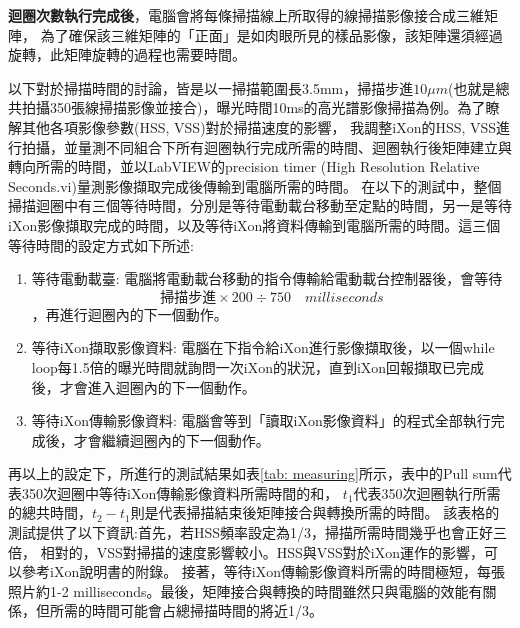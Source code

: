 \documentclass[12pt]{article}
\begin{document}
\textbf{迴圈次數執行完成後}，電腦會將每條掃描線上所取得的線掃描影像接合成三維矩陣，
為了確保該三維矩陣的「正面」是如肉眼所見的樣品影像，該矩陣還須經過旋轉，此矩陣旋轉的過程也需要時間。

以下對於掃描時間的討論，皆是以一掃描範圍長3.5mm，掃描步進$10\mu m$(也就是總共拍攝350張線掃描影像並接合)，曝光時間10ms的高光譜影像掃描為例。為了瞭解其他各項影像參數(HSS, VSS)對於掃描速度的影響，
我調整iXon的HSS, VSS進行拍攝，並量測不同組合下所有迴圈執行完成所需的時間、迴圈執行後矩陣建立與轉向所需的時間，並以LabVIEW的precision timer (High Resolution Relative Seconds.vi)量測影像擷取完成後傳輸到電腦所需的時間。
在以下的測試中，整個掃描迴圈中有三個等待時間，分別是等待電動載台移動至定點的時間，另一是等待iXon影像擷取完成的時間，以及等待iXon將資料傳輸到電腦所需的時間。這三個等待時間的設定方式如下所述:
\begin{enumerate}
    \item 等待電動載臺: 電腦將電動載台移動的指令傳輸給電動載台控制器後，會等待\begin{equation} \label{eq: stageWait}
              \text{掃描步進}\times 200 \div 750 \quad milliseconds
          \end{equation}，再進行迴圈內的下一個動作。
    \item 等待iXon擷取影像資料: 電腦在下指令給iXon進行影像擷取後，以一個while loop每1.5倍的曝光時間就詢問一次iXon的狀況，直到iXon回報擷取已完成後，才會進入迴圈內的下一個動作。
    \item 等待iXon傳輸影像資料: 電腦會等到「讀取iXon影像資料」的程式全部執行完成後，才會繼續迴圈內的下一個動作。
\end{enumerate}
再以上的設定下，所進行的測試結果如表\ref{tab: measuring}所示，表中的Pull sum代表350次迴圈中等待iXon傳輸影像資料所需時間的和，
$t_1$代表350次迴圈執行所需的總共時間，$t_2-t_1$則是代表掃描結束後矩陣接合與轉換所需的時間。
該表格的測試提供了以下資訊:首先，若HSS頻率設定為1/3，掃描所需時間幾乎也會正好三倍，
相對的，VSS對掃描的速度影響較小。HSS與VSS對於iXon運作的影響，可以參考iXon說明書的附錄。\cite{ixonManual}
接著，等待iXon傳輸影像資料所需的時間極短，每張照片約1-2 milliseconds。最後，矩陣接合與轉換的時間雖然只與電腦的效能有關係，但所需的時間可能會占總掃描時間的將近1/3。
\end{document}
